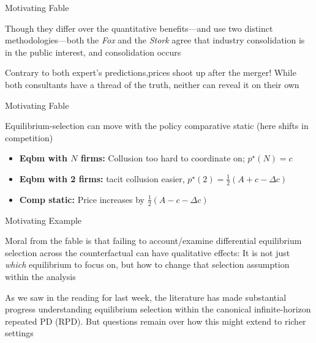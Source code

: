 \documentclass[english]{beamer}
\begin{document}
\begin{frame}{Motivating Fable}
\begin{card} Though they differ over the quantitative benefits---and use two distinct methodologies---both the \emph{Fox} and the \emph{Stork} agree that industry consolidation is in the public interest, and consolidation occurs 
\end{card}\pause
\begin{card} Contrary to both expert's predictions,prices shoot up after the merger! While both consultants have a thread of the truth, neither can reveal it on their own
    \end{card}
\end{frame}

\begin{frame}{Motivating Fable}
    \begin{card}
Equilibrium-selection can move with the policy comparative static (here shifts in competition)
    \begin{itemize}
        \item \textbf{Eqbm with $N$ firms:} Collusion too hard to coordinate on;  $p^{\star}(N)=c$
        \item \textbf{Eqbm with 2 firms:} tacit collusion easier, $p^{\star}(2)=\tfrac{1}{2}(A+c-\Delta c)$
        \item \textbf{Comp static:} Price increases by $\tfrac{1}{2}(A-c-\Delta c)$ 
    \end{itemize}
\end{card}
\end{frame}

\begin{frame}{Motivating Example}
    \begin{card}
         Moral from the fable is that failing to account/examine differential equilibrium selection across the counterfactual can have qualitative effects: It is not just \emph{which} equilibrium to focus on, but how to change that selection assumption within the analysis
 \end{card}

\begin{card}        
       As we saw in the reading for last week, the literature has made substantial  progress understanding equilibrium selection within the canonical infinite-horizon repeated PD (RPD). But questions remain over how this might extend to richer settings
\end{card}
\end{frame}
\end{document}
